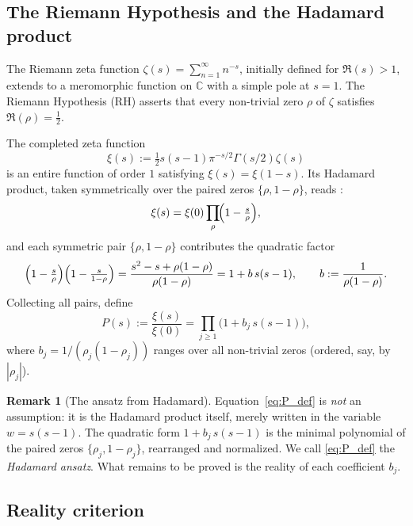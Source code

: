 \documentclass[12pt]{article}
\theoremstyle{plain}
\theoremstyle{definition}
\newtheorem{remark}[theorem]{Remark}
\newcommand{\C}{\mathbb{C}}
\begin{document}
\subsection{The Riemann Hypothesis and the Hadamard product}

The Riemann zeta function $\zeta(s)=\sum_{n=1}^\infty n^{-s}$, initially defined
for $\Re(s)>1$, extends to a meromorphic function on $\C$ with a simple pole at $s=1$.
The Riemann Hypothesis (RH) asserts that every non-trivial zero $\rho$ of $\zeta$
satisfies $\Re(\rho)=\tfrac12$.

The completed zeta function
\begin{equation}\label{eq:xi_def}
  \xi(s) := \tfrac12 s(s-1)\pi^{-s/2}\Gamma(s/2)\zeta(s)
\end{equation}
is an entire function of order $1$ satisfying $\xi(s)=\xi(1-s)$.
Its Hadamard product, taken symmetrically over the paired zeros $\{\rho,1-\rho\}$,
reads \cite{Davenport1980,Titchmarsh1986}:
\begin{equation}\label{eq:hadamard}
  \xi(s) = \xi(0)\prod_{\rho}\!\Bigl(1-\tfrac{s}{\rho}\Bigr),
\end{equation}
and each symmetric pair $\{\rho,1-\rho\}$ contributes the quadratic factor
\begin{equation}\label{eq:quad_factor}
  \Bigl(1-\tfrac{s}{\rho}\Bigr)\Bigl(1-\tfrac{s}{1-\rho}\Bigr)
  = \frac{s^2-s+\rho(1-\rho)}{\rho(1-\rho)}
  = 1 + b\,s(s-1),
  \qquad b := \frac{1}{\rho(1-\rho)}.
\end{equation}
Collecting all pairs, define
\begin{equation}\label{eq:P_def}
  P(s) := \frac{\xi(s)}{\xi(0)} = \prod_{j\ge1}\bigl(1+b_j\,s(s-1)\bigr),
\end{equation}
where $b_j = 1/(\rho_j(1-\rho_j))$ ranges over all non-trivial zeros (ordered,
say, by $|\rho_j|$).

\begin{remark}[The ansatz from Hadamard]
Equation~\eqref{eq:P_def} is \emph{not} an assumption: it is the Hadamard product
itself, merely written in the variable $w=s(s-1)$.  The
quadratic form $1+b_j\,s(s-1)$ is the minimal polynomial of the paired zeros
$\{\rho_j,1-\rho_j\}$, rearranged and normalized.  We call
\eqref{eq:P_def} the \emph{Hadamard ansatz}.  What remains to be proved is the
reality of each coefficient $b_j$.
\end{remark}

\subsection{Reality criterion}
\end{document}
